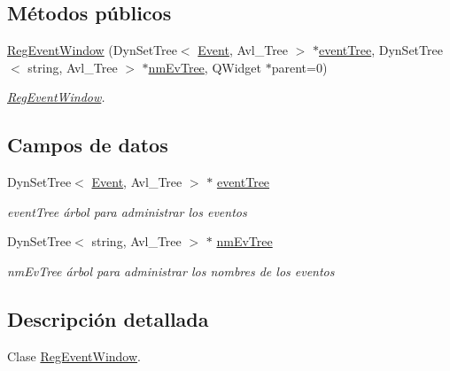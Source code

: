 \subsection*{Métodos públicos}
\begin{DoxyCompactItemize}
\item 
\hyperlink{class_reg_event_window_a641d4f79cc3ade15fed731334dc8f8de}{Reg\+Event\+Window} (Dyn\+Set\+Tree$<$ \hyperlink{class_event}{Event}, Avl\+\_\+\+Tree $>$ $\ast$\hyperlink{class_reg_event_window_ab22b0d13f269a36935f27ae40244d4c4}{event\+Tree}, Dyn\+Set\+Tree$<$ string, Avl\+\_\+\+Tree $>$ $\ast$\hyperlink{class_reg_event_window_aa224e98dd2ebe0d19dd20407e2b6f433}{nm\+Ev\+Tree}, Q\+Widget $\ast$parent=0)
\begin{DoxyCompactList}\small\item\em \hyperlink{class_reg_event_window}{Reg\+Event\+Window}. \end{DoxyCompactList}\end{DoxyCompactItemize}
\subsection*{Campos de datos}
\begin{DoxyCompactItemize}
\item 
Dyn\+Set\+Tree$<$ \hyperlink{class_event}{Event}, Avl\+\_\+\+Tree $>$ $\ast$ \hyperlink{class_reg_event_window_ab22b0d13f269a36935f27ae40244d4c4}{event\+Tree}\hypertarget{class_reg_event_window_ab22b0d13f269a36935f27ae40244d4c4}{}\label{class_reg_event_window_ab22b0d13f269a36935f27ae40244d4c4}

\begin{DoxyCompactList}\small\item\em event\+Tree árbol para administrar los eventos \end{DoxyCompactList}\item 
Dyn\+Set\+Tree$<$ string, Avl\+\_\+\+Tree $>$ $\ast$ \hyperlink{class_reg_event_window_aa224e98dd2ebe0d19dd20407e2b6f433}{nm\+Ev\+Tree}\hypertarget{class_reg_event_window_aa224e98dd2ebe0d19dd20407e2b6f433}{}\label{class_reg_event_window_aa224e98dd2ebe0d19dd20407e2b6f433}

\begin{DoxyCompactList}\small\item\em nm\+Ev\+Tree árbol para administrar los nombres de los eventos \end{DoxyCompactList}\end{DoxyCompactItemize}


\subsection{Descripción detallada}
Clase \hyperlink{class_reg_event_window}{Reg\+Event\+Window}. 

